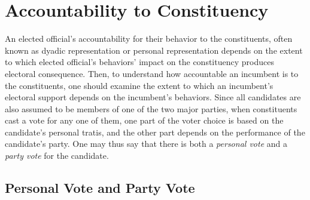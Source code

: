 \documentclass{article}
\begin{document}
		
		
		

	\section*{Accountability to Constituency}
		
%		
		An elected official's accountability for their behavior
		to the constituents,
		often known as dyadic representation
		\autocites
		[][]
		{millerConstituencyInfluenceCongress1963}
		{weissbergCollectiveVsDyadic1978}
		{ansolabehereDyadicRepresentation2011}
		or personal representation
		\autocites
		[][]
		{colomerPersonalRepresentationNeglected2011}
		depends on
		the extent to which elected official's behaviors' impact on the constituency
		produces electoral consequence.
		Then,
		to understand how accountable an incumbent is to the constituents,
		one should examine
		the extent to which an incumbent's electoral support depends on the incumbent's behaviors.
		Since all candidates are also
		assumed to be
		members of one of the two major parties,
		when constituents cast a vote for any one of them,
		one part of the voter choice is based on the candidate's personal tratis,
		and the other part depends on the performance of the candidate's party. 
		One may thus say that there is both
		a \textit{personal vote}
		and a \textit{party vote} for the candidate.
	
		\subsection*{Personal Vote and Party Vote}
		
\end{document}
